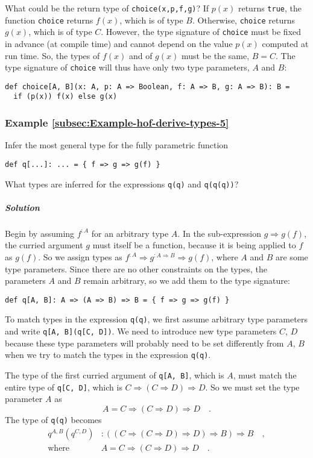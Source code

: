 What could be the return type of \lstinline!choice(x,p,f,g)!? If
$p(x)$ returns \lstinline!true!, the function \lstinline!choice!
returns $f(x)$, which is of type $B$. Otherwise, \lstinline!choice!
returns $g(x)$, which is of type $C$. However, the type signature
of \lstinline!choice! must be fixed in advance (at compile time)
and cannot depend on the value $p(x)$ computed at run time. So, the
types of $f(x)$ and of $g(x)$ must be the same, $B=C$. The type
signature of \lstinline!choice! will thus have only two type parameters,
$A$ and $B$:
\begin{lstlisting}
def choice[A, B](x: A, p: A => Boolean, f: A => B, g: A => B): B =
  if (p(x)) f(x) else g(x)
\end{lstlisting}


\subsubsection{Example \label{subsec:Example-hof-derive-types-5}\ref{subsec:Example-hof-derive-types-5}}

Infer the most general type for the fully parametric function
\begin{lstlisting}
def q[...]: ... = { f => g => g(f) }
\end{lstlisting}
What types are inferred for the expressions \lstinline!q(q)! and
\lstinline!q(q(q))!?

\subparagraph{Solution}

Begin by assuming $f^{:A}$ for an arbitrary type $A$. In the sub-expression
$g\Rightarrow g(f)$, the curried argument $g$ must itself be a function,
because it is being applied to $f$ as $g(f)$. So we assign types
as $f^{:A}\Rightarrow g^{:A\Rightarrow B}\Rightarrow g(f)$, where
$A$ and $B$ are some type parameters. Since there are no other constraints
on the types, the parameters $A$ and $B$ remain arbitrary, so we
add them to the type signature:
\begin{lstlisting}
def q[A, B]: A => (A => B) => B = { f => g => g(f) }
\end{lstlisting}

To match types in the expression \lstinline!q(q)!, we first assume
arbitrary type parameters and write \lstinline!q[A, B](q[C, D])!.
We need to introduce new type parameters $C$, $D$ because these
type parameters will probably need to be set differently from $A$,
$B$ when we try to match the types in the expression \lstinline!q(q)!.

The type of the first curried argument of \lstinline!q[A, B]!, which
is $A$, must match the entire type of \lstinline!q[C, D]!, which
is $C\Rightarrow\left(C\Rightarrow D\right)\Rightarrow D$. So we
must set the type parameter $A$ as
\[
A=C\Rightarrow\left(C\Rightarrow D\right)\Rightarrow D\quad.
\]
The type of \lstinline!q(q)! becomes
\begin{align*}
q^{A,B}(q^{C,D}) & :\left(\left(C\Rightarrow\left(C\Rightarrow D\right)\Rightarrow D\right)\Rightarrow B\right)\Rightarrow B\quad,\\
\text{where}\quad & A=C\Rightarrow\left(C\Rightarrow D\right)\Rightarrow D\quad.
\end{align*}

